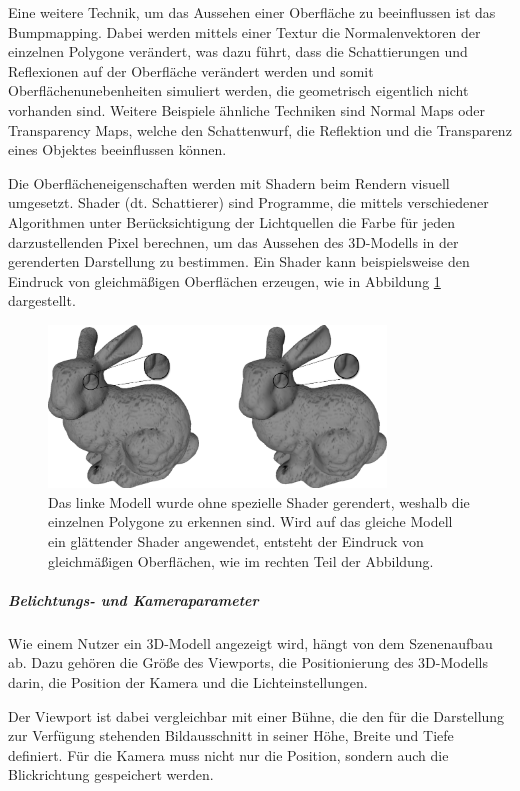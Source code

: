 Eine weitere Technik, um das Aussehen einer Oberfläche zu beeinflussen ist das Bumpmapping. Dabei werden mittels einer Textur die Normalenvektoren der einzelnen Polygone verändert, was dazu führt, dass die Schattierungen und Reflexionen auf der Oberfläche verändert werden und somit Oberflächenunebenheiten simuliert werden, die geometrisch eigentlich nicht vorhanden sind. Weitere Beispiele ähnliche Techniken sind Normal Maps oder Transparency Maps, welche den Schattenwurf, die Reflektion und die Transparenz eines Objektes beeinflussen können. 

Die Oberflächeneigenschaften werden mit Shadern beim Rendern visuell umgesetzt. Shader (dt. Schattierer) sind Programme, die mittels verschiedener Algorithmen unter Berücksichtigung der Lichtquellen die Farbe für jeden darzustellenden Pixel berechnen, um das Aussehen des 3D-Modells in der gerenderten Darstellung zu bestimmen. Ein Shader kann beispielsweise den Eindruck von gleichmäßigen Oberflächen erzeugen, wie in Abbildung \ref{abb:3D-render} dargestellt.

\begin{figure}[!hbt]
  \begin{center}
    \includegraphics[width=0.8\textwidth]{bilder/3D_Render}
  \end{center}
  \caption{Das linke Modell wurde ohne spezielle Shader gerendert, weshalb die einzelnen Polygone zu erkennen sind. Wird auf das gleiche Modell ein glättender Shader angewendet, entsteht der Eindruck von gleichmäßigen Oberflächen, wie im rechten Teil der Abbildung.}
	\label{abb:3D-render}
\end{figure}


\subparagraph{Belichtungs- und Kameraparameter}
Wie einem Nutzer ein 3D-Modell angezeigt wird, hängt von dem Szenenaufbau ab. Dazu gehören die Größe des Viewports, die Positionierung des 3D-Modells darin, die Position der Kamera und die Lichteinstellungen.

Der Viewport ist dabei vergleichbar mit einer Bühne, die den für die Darstellung zur Verfügung stehenden Bildausschnitt in seiner Höhe, Breite und Tiefe definiert. Für die Kamera muss nicht nur die Position, sondern auch die Blickrichtung gespeichert werden.


